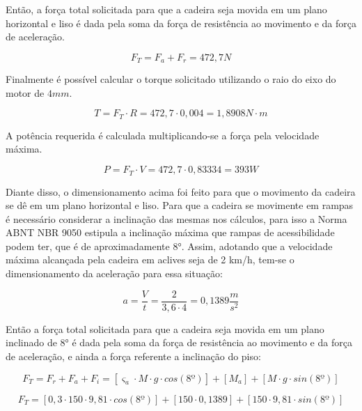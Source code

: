 Então, a força total solicitada para que a cadeira seja movida 
em um plano 
horizontal e liso é dada pela soma da força de resistência ao 
movimento e da força de aceleração.

\begin{equation}
F_{T} = F_{a} + F_{r} = 472,7 N
\end{equation}

Finalmente é possível calcular o torque solicitado utilizando o raio do eixo do
motor de $4mm$.

\begin{equation}
T = F_{T} \cdot R = 472,7 \cdot 0,004 = 1,8908 N\cdot m
\end{equation}

A potência requerida é calculada multiplicando-se a força pela velocidade máxima.

\begin{equation}
P = F_{T} \cdot V = 472,7 \cdot 0,83334 = 393 W
\end{equation}

Diante disso, o dimensionamento acima foi feito para que o 
movimento da cadeira se dê em um plano horizontal e liso. 
Para que a cadeira se movimente em rampas é necessário considerar 
a inclinação das mesmas nos cálculos, para isso a Norma ABNT NBR 9050 \cite{nbr9050}
estipula a inclinação máxima que rampas de acessibilidade 
podem ter, que é de aproximadamente 8°. Assim, adotando que a velocidade 
máxima alcançada pela cadeira em aclives seja de 2 km/h, tem-se o 
dimensionamento da aceleração para essa situação: 

\begin{equation}
a = \frac{V}{t} = \frac{2}{3,6 \cdot 4} = 0,1389 \frac{m}{s^2}
\end{equation}

Então a força total solicitada para que a cadeira seja movida 
em um plano inclinado de 8° é dada pela soma da força de resistência 
ao movimento e da força de aceleração, e ainda a força referente a inclinação do piso:

\begin{equation}
F_{T} = F_{r} + F_{a} + F_{i} = [\varsigma_{a} \cdot M \cdot g \cdot cos(8º)] + [M_{a}] + [M \cdot g \cdot sin(8º)]
\end{equation}

\begin{equation}
F_{T} = [0,3 \cdot 150 \cdot 9,81 \cdot cos(8º)] + [150 \cdot 0,1389] + [150 \cdot 9,81 \cdot sin(8º)]
\end{equation}

